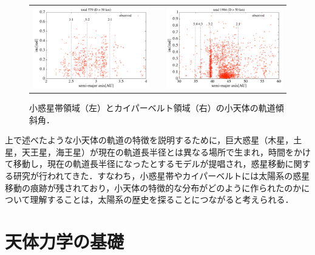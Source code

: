 \documentclass[11pt,a4paper,oneside,onecolumn]{jreport}
\begin{document}
\begin{figure}[H]
\begin{tabular}{ccc}
\begin{minipage}[t]{0.45\hsize}
\centering
\includegraphics[width=8cm]{./image/mainbelt_inc.pdf}
\end{minipage} &
\begin{minipage}[t]{0.1\hsize}
\end{minipage} &
\begin{minipage}[t]{0.45\hsize}
\centering
\includegraphics[width=8cm]{./image/kuiperbelt_inc.pdf}
\end{minipage}\\
%
\end{tabular}
\caption{小惑星帯領域（左）とカイパーベルト領域（右）の小天体の軌道傾斜角．\label{fig:obs_inc}}
\end{figure}

上で述べたような小天体の軌道の特徴を説明するために，巨大惑星（木星，土星，天王星，海王星）が現在の軌道長半径とは異なる場所で生まれ，時間をかけて移動し，現在の軌道長半径になったとするモデルが提唱され，惑星移動に関する研究が行われてきた．すなわち，小惑星帯やカイパーベルトには太陽系の惑星移動の痕跡が残されており，小天体の特徴的な分布がどのように作られたのかについて理解することは，太陽系の歴史を探ることにつながると考えられる．


\chapter{天体力学の基礎}
\end{document}
